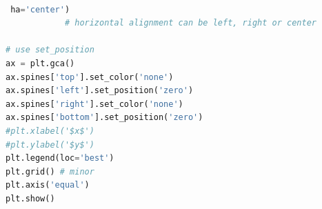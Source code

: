 \documentclass{beamer}
\theoremstyle{remark}
\begin{document}
\begin{frame}[fragile]

\begin{lstlisting}[language=python, basicstyle=\ttfamily\small, keywordstyle=\color{blue}]
            
 ha='center') 
            # horizontal alignment can be left, right or center

# use set_position
ax = plt.gca()
ax.spines['top'].set_color('none')
ax.spines['left'].set_position('zero')
ax.spines['right'].set_color('none')
ax.spines['bottom'].set_position('zero')
#plt.xlabel('$x$')
#plt.ylabel('$y$')
plt.legend(loc='best')
plt.grid() # minor
plt.axis('equal')
plt.show()

\end{lstlisting}
\end{frame}
\end{document}
